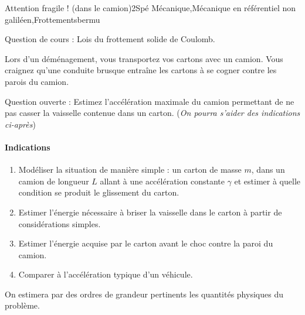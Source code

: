 
\begin{exercise}{Attention fragile ! (dans le camion)}{2}{Spé}
{Mécanique,Mécanique en référentiel non galiléen,Frottements}{bermu}


\textsf{Question de cours :} Lois du frottement solide de Coulomb.

Lors d'un déménagement, vous transportez vos cartons avec un camion.
Vous craignez qu'une conduite brusque entraîne les cartons à se cogner contre les parois du camion.

\textsf{Question ouverte :} Estimez l'accélération maximale du camion permettant de ne pas casser la vaisselle contenue dans un carton. (\textsl{On pourra s'aider des indications ci-après})

\paragraph{Indications}

\begin{enumerate}
    \item Modéliser la situation de manière simple : un carton de masse $m$, dans un camion de longueur $L$ allant à une accélération constante $\gamma$ et estimer à quelle condition se produit le glissement du carton.
    \item Estimer l'énergie nécessaire à briser la vaisselle dans le carton à partir de considérations simples.
    \item Estimer l'énergie acquise par le carton avant le choc contre la paroi du camion.
    \item Comparer à l'accélération typique d'un véhicule.
\end{enumerate}

On estimera par des ordres de grandeur pertinents les quantités physiques du problème.

\end{exercise}

